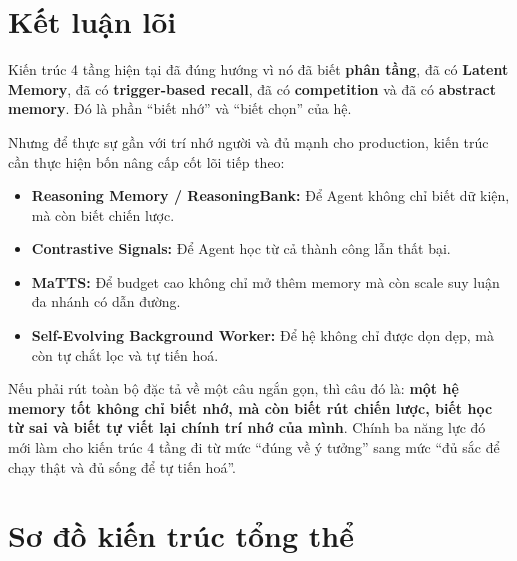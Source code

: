 \documentclass[a4paper,12pt]{article}
\begin{document}
\section{Kết luận lõi}

Kiến trúc 4 tầng hiện tại đã đúng hướng vì nó đã biết \textbf{phân tầng}, đã có \textbf{Latent Memory}, đã có \textbf{trigger-based recall}, đã có \textbf{competition} và đã có \textbf{abstract memory}. Đó là phần ``biết nhớ'' và ``biết chọn'' của hệ.

Nhưng để thực sự gần với trí nhớ người và đủ mạnh cho production, kiến trúc cần thực hiện bốn nâng cấp cốt lõi tiếp theo:
\begin{itemize}
    \item \textbf{Reasoning Memory / ReasoningBank:} Để Agent không chỉ biết dữ kiện, mà còn biết chiến lược.
    \item \textbf{Contrastive Signals:} Để Agent học từ cả thành công lẫn thất bại.
    \item \textbf{MaTTS:} Để budget cao không chỉ mở thêm memory mà còn scale suy luận đa nhánh có dẫn đường.
    \item \textbf{Self-Evolving Background Worker:} Để hệ không chỉ được dọn dẹp, mà còn tự chắt lọc và tự tiến hoá.
\end{itemize}

Nếu phải rút toàn bộ đặc tả về một câu ngắn gọn, thì câu đó là: \textbf{một hệ memory tốt không chỉ biết nhớ, mà còn biết rút chiến lược, biết học từ sai và biết tự viết lại chính trí nhớ của mình}. Chính ba năng lực đó mới làm cho kiến trúc 4 tầng đi từ mức ``đúng về ý tưởng'' sang mức ``đủ sắc để chạy thật và đủ sống để tự tiến hoá''.


\appendix
\newpage

\section{Sơ đồ kiến trúc tổng thể}
\end{document}
